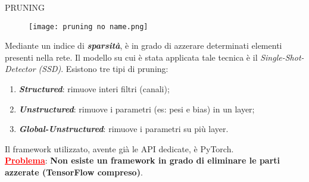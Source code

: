 \begin{frame}{PRUNING}
    \begin{figure}
        \texttt{[image: pruning no name.png]}
    \end{figure}
    Mediante un indice di {\bfseries{\emph{sparsità}}}, è in grado di azzerare determinati elementi presenti nella rete.
    Il modello su cui è stata applicata tale tecnica è il \emph{Single-Shot-Detector (SSD)}.
    Esistono tre tipi di pruning:
    \begin{enumerate}
        \item {\bfseries{\emph{Structured}}}: rimuove interi filtri (canali);
        \item {\bfseries{\emph{Unstructured}}}: rimuove i parametri (es: pesi e bias) in un layer;
        \item {\bfseries{\emph{Global-Unstructured}}}: rimuove i parametri su più layer.
    \end{enumerate}
    Il framework utilizzato, avente già le API dedicate, è PyTorch.\\
    {\textcolor{red}{\textbf{\ul{Problema}}}}: {\bfseries{Non esiste un framework in grado di eliminare le parti azzerate (TensorFlow compreso)}}.
\end{frame}